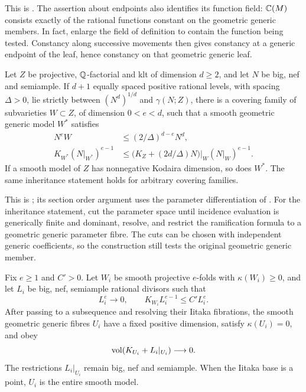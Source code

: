 This is \cite[Lemma~6.2]{UPI}.
The assertion about endpoints also identifies its function field:
$\mathbb C(M)$ consists exactly of the rational functions constant on the
geometric generic members.  In fact, enlarge the field of definition
to contain the function being tested.  Constancy along successive
movements then gives constancy at a generic endpoint of the leaf,
hence constancy on that geometric generic leaf.

\begin{externalinput}\label{input:rank:tracking}
Let $Z$ be projective, $\mathbb Q$-factorial and klt of dimension $d\ge2$, and
let $N$ be big, nef and semiample.  If $d+1$ equally spaced positive
rational levels, with spacing $\Delta>0$, lie strictly between
$(N^d)^{1/d}$ and $\gamma(N;Z)$, there is a covering family of
subvarieties $W\subset Z$, of dimension $0<e<d$, such that a smooth
geometric generic model $W^*$ satisfies
\begin{align}
 N^eW&\le(2/\Delta)^{d-e}N^d,\label{eq:rank:tracking-degree}\\
 K_{W^*}(N|_{W^*})^{e-1}
 &\le\bigl(K_Z+(2d/\Delta)N\bigr)|_W(N|_W)^{e-1}.
 \label{eq:rank:tracking-canonical}
\end{align}
If a smooth model of $Z$ has nonnegative Kodaira dimension, so does
$W^*$.  The same inheritance statement holds for arbitrary covering
families.
\end{externalinput}

This is \cite[Lemma~6.3]{UPI}; its section
order argument uses the parameter differentiation of
\citet[Proposition~2.3]{EKL1995}.  For the inheritance statement, cut the
parameter space until incidence evaluation is generically finite and
dominant, resolve, and restrict the ramification formula to a geometric
generic parameter fibre.  The cuts can be chosen with independent
generic coefficients, so the construction still tests the original
geometric generic member.

\begin{externalinput}\label{input:rank:small-fibre}
Fix $e\ge1$ and $C'>0$.  Let $W_i$ be smooth projective $e$-folds with
$\kappa(W_i)\ge0$, and let $L_i$ be big, nef, semiample rational
divisors such that
\[
                 L_i^e\longrightarrow0,
                 \qquad K_{W_i}L_i^{e-1}\le C'L_i^e.
\]
After passing to a subsequence and resolving their Iitaka fibrations,
the smooth geometric generic fibres $U_i$ have a fixed positive
dimension, satisfy $\kappa(U_i)=0$, and obey
\[
                    \operatorname{vol}(K_{U_i}+L_i|_{U_i})\longrightarrow0.
\]
The restrictions $L_i|_{U_i}$ remain big, nef and semiample.  When the
Iitaka base is a point, $U_i$ is the entire smooth model.
\end{externalinput}

